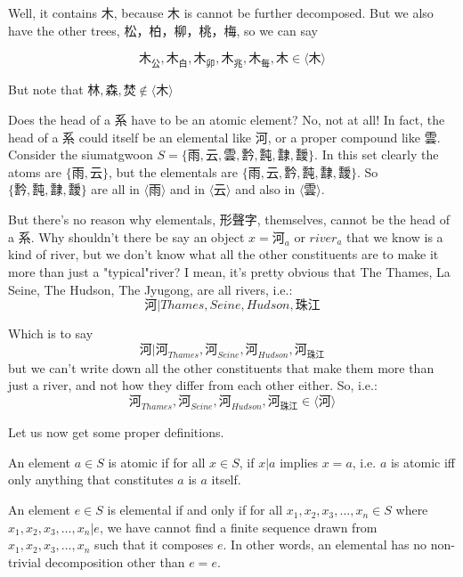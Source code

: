 Well, it contains $\text{木}$, because $\text{木}$ is cannot be further decomposed. But we also have the other trees, 松，柏，柳，桃，梅, so we can say 

$$\text{木}_{\text{公}},\text{木}_{\text{白}},\text{木}_{\text{卯}},\text{木}_{\text{兆}},\text{木}_{\text{每}},  \text{木} \in \langle \text{木} \rangle$$



But note that $\text{林}, \text{森},  \text{焚} \not\in \langle \text{木} \rangle$

Does the head of a 系 have to be an atomic element? No, not at all! In fact, the head of a 系 could itself be an elemental like 河, or a proper compound like 雲. Consider the siumatgwoon $S = \{\text{雨}, \text{云}, \text{雲}, \text{霒}, \text{霕}, \text{霴}, \text{靉}\}$. In this set clearly the atoms are $\{\text{雨}, \text{云}\}$, but the elementals are $\{\text{雨}, \text{云}, \text{霒}, \text{霕}, \text{霴}, \text{靉}\}$. So $\{\text{霒}, \text{霕}, \text{霴}, \text{靉}\}$ are all in $\langle \text{雨} \rangle$ and in $\langle \text{云} \rangle$ and also in $\langle \text{雲} \rangle$.

But there's no reason why elementals, 形聲字, themselves, cannot be the head of a 系. Why shouldn't there be say an object $x=\text{河}_{a}$ or $river_{a}$ that we know is a kind of river, but we don't know what all the other constituents are to make it more than just a "typical"river? I mean, it's pretty obvious that The Thames, La Seine, The Hudson, The Jyugong, are all rivers, i.e.: 
$$\text{河} | Thames, Seine, Hudson, \text{珠江}$$

Which is to say 
$$\text{河} |  \text{河}_{Thames},\text{河}_{Seine},\text{河}_{Hudson},\text{河}_{\text{珠江}} $$
but we can't write down all the other constituents that make them more than just a river, and not how they differ from each other either. So, 
i.e.: 
$$\text{河}_{Thames},\text{河}_{Seine},\text{河}_{Hudson},\text{河}_{\text{珠江}} \in \langle \text{河} \rangle$$



Let us now get some proper definitions.


\begin{definition}[Atomics]\label{def:atomics}
    An element $a \in S$ is atomic if for all $x\in S$, if $x|a$ implies $x=a$, i.e. $a$ is atomic iff only anything that constitutes $a$ is $a$ itself.
\end{definition}

\begin{definition}[Elementals]\label{def:elementals}
    An element $e \in S$ is elemental if and only if for all $x_1, x_2, x_3, \ldots, x_n \in S$ where $x_1, x_2, x_3, \ldots, x_n | e$, we have cannot find a finite sequence drawn from $x_1, x_2, x_3,\ldots, x_n $ such that it composes $e$. In other words, an elemental has no non-trivial decomposition other than $e = e$. 
\end{definition}


